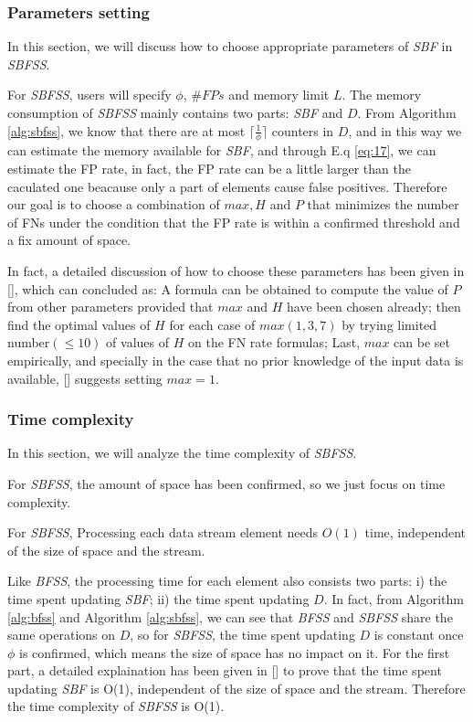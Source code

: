 \documentclass[conference]{IEEEtran}
\begin{document}
\subsubsection{\textbf{Parameters setting}}
In this section, we will discuss how to choose appropriate parameters of \emph{SBF} in \emph{SBFSS}.\par 
For \emph{SBFSS}, users will specify $\phi$, $\#FPs$ and memory limit $L$. The memory consumption of \emph{SBFSS} mainly contains two parts: \emph{SBF} and $D$. From Algorithm \ref{alg:sbfss}, we know that there are at most $\lceil\frac{1}{\phi}\rceil$ counters in $D$, and in this way we can estimate the memory available for \emph{SBF}, and through E.q \ref{eq:17}, we can estimate the FP rate, in fact, the FP rate can be a little larger than the caculated one beacause only a part of elements cause false positives. Therefore our goal is to choose a combination of $max,H$ and $P$ that minimizes the number of FNs under the condition that the FP rate is within a confirmed threshold and a fix amount of space.\par
In fact, a detailed discussion of how to choose these parameters has been given in [], which can concluded as: A formula can be obtained to compute the value of $P$ from other parameters provided that $max$ and $H$ have been chosen already; then ﬁnd the optimal values of $H$ for each case of $max(1,3,7)$ by trying limited number$(\leq 10)$ of values of $H$ on the FN rate formulas; Last, $max$ can be set empirically, and specially in the case that no prior knowledge of the input data is available, [] suggests setting $max=1$.

\subsubsection{\textbf{Time complexity}}
In this section, we will analyze the time complexity of \emph{SBFSS}.\par
For \emph{SBFSS}, the amount of space has been confirmed, so we just focus on time complexity.

\begin{theorem}\label{thm:8}
For \emph{SBFSS}, Processing each data stream element needs $O(1)$ time, independent of the size of space and the stream.
\end{theorem}

\begin{IEEEproof}
Like \emph{BFSS}, the processing time for each element also consists two parts: i) the time spent updating \emph{SBF}; ii) the time spent updating $D$. In fact, from Algorithm \ref{alg:bfss} and Algorithm \ref{alg:sbfss}, we can see that \emph{BFSS} and \emph{SBFSS} share the same operations on $D$, so for \emph{SBFSS}, the time spent updating $D$ is constant once $\phi$ is confirmed, which means the size of space has no impact on it. For the first part, a detailed explaination has been given in [] to prove that the time spent updating \emph{SBF} is O(1), independent of the size of space and the stream. Therefore the time complexity of \emph{SBFSS} is O(1).
\end{IEEEproof}
\end{document}
